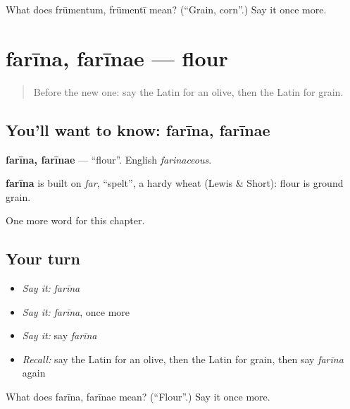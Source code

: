 \begin{tcolorbox}[breakable,colback=teal!4,colframe=teal!35!black,title={Before you move on}]
What does frūmentum, frūmentī mean? (\textquotedblleft{}Grain, corn\textquotedblright{}.) Say it once more.
\end{tcolorbox}
\section[farīna, farīnae]{farīna, farīnae — flour}

\label{lesson:LA-C81-farina}



\begin{quote}
Before the new one: say the Latin for an olive, then the Latin for grain.
\end{quote}

\subsection*{You'll want to know: farīna, farīnae}
\textbf{farīna, farīnae} — \textquotedblleft{}flour\textquotedblright{}. English \emph{farinaceous}.

\begin{cousinweb}
\textbf{farīna} is built on \emph{far}, \textquotedblleft{}spelt\textquotedblright{}, a hardy wheat (Lewis \& Short): flour is ground grain.
\end{cousinweb}

\begin{grammarlens}[title={What you've built}]
One more word for this chapter.
\end{grammarlens}

\subsection*{Your turn}
\begin{itemize}
\raggedright
  \item \emph{Say it:} \emph{farīna}
  \item \emph{Say it:} \emph{farīna}, once more
  \item \emph{Say it:} say \emph{farīna}
  \item \emph{Recall:} say the Latin for an olive, then the Latin for grain, then say \emph{farīna} again
\end{itemize}

\begin{tcolorbox}[breakable,colback=teal!4,colframe=teal!35!black,title={Before you move on}]
What does farīna, farīnae mean? (\textquotedblleft{}Flour\textquotedblright{}.) Say it once more.
\end{tcolorbox}
